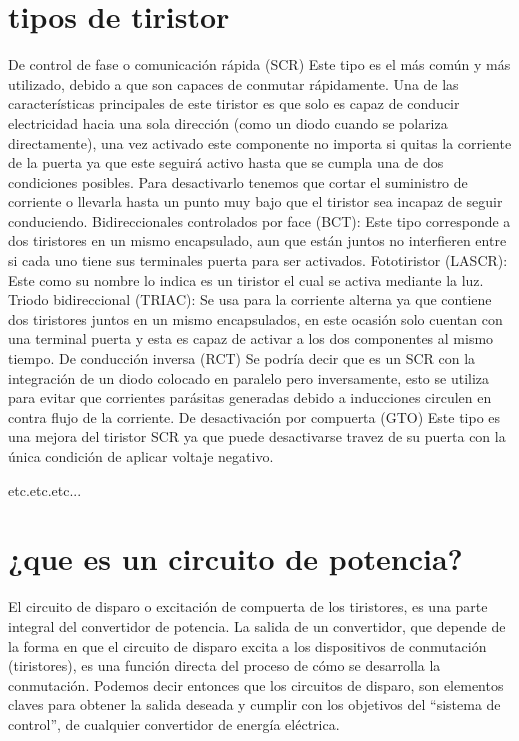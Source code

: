 \documentclass[14pt,letterpaper]{article}
\begin{document}
\section{tipos de tiristor}
De control de fase o comunicación rápida (SCR)
Este tipo es el más común y más utilizado, debido a que son capaces de conmutar rápidamente. Una de las características principales de este tiristor es que solo es capaz de conducir electricidad hacia una sola dirección (como un diodo cuando se polariza directamente), una vez activado este componente no importa si quitas la corriente de la puerta ya que este seguirá activo hasta que se cumpla una de dos condiciones posibles. Para desactivarlo tenemos que cortar el suministro de corriente o llevarla hasta un punto muy bajo que el tiristor sea incapaz de seguir conduciendo.
\linebreak 
\linebreak
Bidireccionales controlados por face (BCT):
Este tipo corresponde a dos tiristores en un mismo encapsulado, aun que están juntos no interfieren entre si cada uno tiene sus terminales puerta para ser activados.
\linebreak
\linebreak
Fototiristor (LASCR):
Este como su nombre lo indica es un tiristor el cual se activa mediante la luz.
\linebreak
\linebreak
Triodo bidireccional (TRIAC):
Se usa para la corriente alterna ya que contiene dos tiristores juntos  en un mismo encapsulados, en este ocasión solo cuentan con una terminal puerta y esta es capaz de activar a los dos componentes al mismo tiempo. 
\linebreak
\linebreak
De conducción inversa (RCT)
Se podría decir que es un SCR con la integración de un diodo colocado en paralelo pero inversamente, esto se utiliza para evitar que corrientes parásitas generadas debido a inducciones circulen en contra flujo de la corriente.
\linebreak
\linebreak
De desactivación por compuerta (GTO)
Este tipo es una mejora del tiristor SCR ya que puede desactivarse travez de su puerta con la única condición de aplicar voltaje negativo.

etc.etc.etc...
\newpage
\section{¿que es un circuito de potencia?}
El circuito de disparo o excitación de compuerta de los tiristores, es una parte integral
del convertidor de potencia. La salida de un convertidor, que depende de la forma en
que el circuito de disparo excita a los dispositivos de conmutación (tiristores), es una
función directa del proceso de cómo se desarrolla la conmutación. Podemos decir
entonces que los circuitos de disparo, son elementos claves para obtener la salida
deseada y cumplir con los objetivos del “sistema de control”, de cualquier convertidor
de energía eléctrica.
\linebreak
\linebreak
\linebreak
\end{document}
